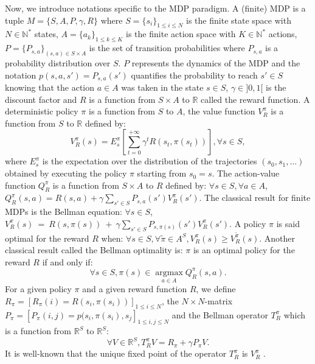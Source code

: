 \documentclass[11pt]{article}
\newcommand{\argmax}{\operatorname*{argmax}}
\newcommand{\0}{\mathbf{0}}
\newcommand{\1}{\mathbf{1}}
\begin{document}
Now, we introduce notations specific to the MDP paradigm. A (finite) MDP \cite{puterman1994markov} is a tuple $M=\{S,A,P,\gamma,R\}$ where $S=\{s_i\}_{1\leq i \leq N}$ is the finite state space with $N\in\mathbb{N}^*$ states, $A=\{a_k\}_{1\leq k \leq K}$ is the finite action space with $K\in\mathbb{N}^*$ actions, $P=\{P_{s,a}\}_{(s,a)\in S\times A}$ is the set of transition probabilities where $P_{s,a}$ is a probability distribution over $S$. $P$ represents the dynamics of the MDP and the notation $p(s,a,s')=P_{s,a}(s')$ quantifies the probability to reach $s'\in S$ knowing that the action $a \in A$ was taken in the state $s\in S$, $\gamma\in]0,1[$ is the discount factor and $R$ is a function from $S\times A$ to $\mathbb{R}$ called the reward function. A deterministic policy $\pi$ is a function from $S$ to $A$, the value function $V^\pi_R$ is a function from $S$ to $\mathbb{R}$ defined by:
\begin{equation}
V^\pi_R(s)=E^\pi_s[\sum_{t=0}^{+\infty}\gamma^tR(s_t,\pi(s_t))], \forall s \in S,
\end{equation}
where $E^\pi_s$ is the expectation over the distribution of the trajectories $(s_0,s_1,\dots)$ obtained by executing the policy $\pi$ starting from $s_0=s$.
The action-value function $Q^\pi_R$ is a function from $S\times A$ to $R$ defined by: $\forall s\in S, \forall a\in A$, $Q^{\pi}_R(s,a)=R(s,a)+\gamma\sum_{s'\in S}P_{s,a}(s')V^{\pi}_R(s')$. The classical result for finite MDPs is the Bellman equation: $\forall s\in S$, $V^{\pi}_R(s)~=~R(s,\pi(s))~+~\gamma\sum_{s'\in S}P_{s,\pi(s)}(s')V^{\pi}_R(s')$.
A policy $\pi$ is said optimal for the reward $R$ when:
$\forall s\in S, \forall \tilde{\pi}\in A^{S}, V^{\pi}_R(s)\geq V^{\tilde{\pi}}_R(s)$.
Another classical result called the Bellman optimality is: $\pi$ is an optimal policy for the reward $R$ if and only if:
\begin{equation}
\label{equation:Qoptimal}
\forall s\in S, \pi(s)\in\argmax_{a\in A} Q^\pi_R(s,a).
\end{equation}
For a given policy $\pi$ and a given reward function $R$, we define $R_\pi=[R_\pi(i)=R(s_i,\pi(s_i))]_{1\leq i \leq N}$, the $N\times N$-matrix $P_\pi=[P_\pi(i,j)=p(s_i,\pi(s_i),s_j]_{1\leq i,j \leq N}$ and the Bellman operator $T^\pi_R$ which is a function from $\mathbb{R}^S$ to $\mathbb{R}^S$:
\begin{equation}
\forall V\in\mathbb{R}^S, T^\pi_RV=R_\pi+\gamma P_\pi V.
\end{equation}
It is well-known that the unique fixed point of the operator $T^\pi_R$ is  $V^\pi_R$ \cite{puterman1994markov}.
\end{document}

